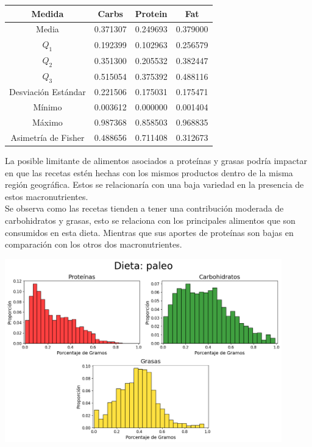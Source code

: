\documentclass[12pt,a4paper]{article}
\begin{document}
            \begin{center}
                \begin{tabular}{| c | c c c |}
                    \toprule
                    Medida & Carbs & Protein & Fat \\
                    \midrule
                    Media               & 0.371307 & 0.249693 & 0.379000  \\
                    $Q_1$               & 0.192399 & 0.102963 & 0.256579  \\
                    $Q_2$               & 0.351300 & 0.205532 & 0.382447  \\
                    $Q_3$               & 0.515054 & 0.375392 & 0.488116  \\
                    Desviación Estándar & 0.221506 & 0.175031 & 0.175471  \\
                    Mínimo              & 0.003612 & 0.000000 & 0.001404  \\
                    Máximo              & 0.987368 & 0.858503 & 0.968835  \\
                    Asimetría de Fisher & 0.488656 & 0.711408 & 0.312673  \\
                    \bottomrule
                \end{tabular}
            \end{center}

            La posible limitante de alimentos asociados a proteínas	y grasas 
            podría impactar en que las recetas estén hechas con los mismos productos 
            dentro de la misma región geográfica. Estos se relacionaría con una 
            baja variedad en la presencia de estos macronutrientes.\\

            Se observa como las recetas tienden a tener una contribución moderada de 
            carbohidratos y grasas, esto se relaciona con los principales alimentos 
            que son consumidos en esta dieta. Mientras que sus aportes de proteínas 
            son bajas en comparación con los otros dos macronutrientes.
            
            \begin{center}
                \includegraphics[width=0.90\textwidth]{Resources/2_03_plot_04.png}
            \end{center}
\end{document}
